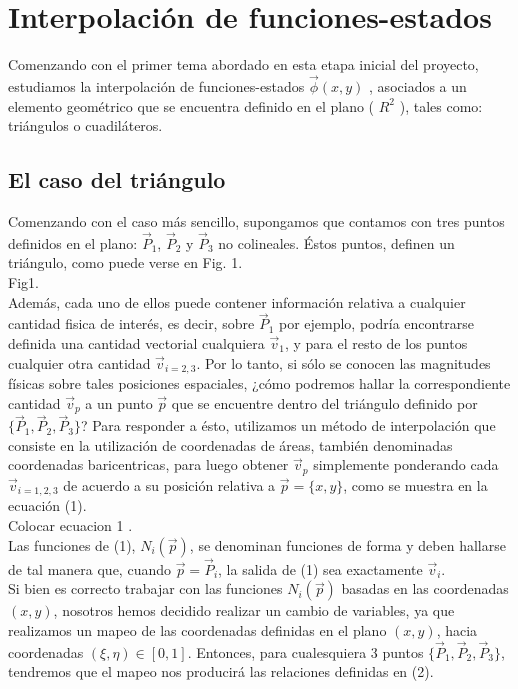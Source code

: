 \section{Interpolación de funciones-estados}

Comenzando con el primer tema abordado en esta etapa inicial del proyecto, estudiamos la interpolación de funciones-estados $\vec{ \phi } (x,y)$ , asociados a un elemento geométrico que se encuentra definido en el plano ( $R^2$ ), tales como: triángulos o cuadiláteros.

\subsection{El caso del triángulo}
\label{sec:triangulos}
Comenzando con el caso más sencillo, supongamos que contamos con tres puntos definidos en el plano: $ \vec{P}_{1} $, $ \vec{P}_{2} $ y $ \vec{P}_{3} $ no colineales. Éstos puntos, definen un triángulo, como puede verse en Fig. 1.
\\
Fig1.
\\
Además, cada uno de ellos puede contener información relativa a cualquier cantidad fisica de interés, es decir, sobre $ \vec{P}_{1} $ por ejemplo, podría encontrarse definida una cantidad vectorial cualquiera $ \vec{v}_{1}$, y para el resto de los puntos cualquier otra cantidad $ \vec{v}_{i=2,3} $. Por lo tanto, si sólo se conocen las magnitudes físicas sobre tales posiciones espaciales, ¿cómo podremos hallar la correspondiente cantidad $ \vec{v}_{p} $ a un punto $\vec{p}$ que se encuentre dentro del triángulo definido por $ \lbrace \vec{P}_{1}, \vec{P}_{2}, \vec{P}_{3}  \rbrace $? Para responder a ésto, utilizamos un método de interpolación que consiste en la utilización de coordenadas de áreas, también denominadas coordenadas baricentricas, para luego obtener $ \vec{v}_{p} $ simplemente ponderando cada $ \vec{v}_{i=1,2,3} $ de acuerdo a su posición relativa a $ \vec{p} = \lbrace x,y \rbrace $, como se muestra en la ecuación (1).
\\
Colocar ecuacion 1 .
\\
Las funciones de (1), $ N_{i} ( \vec{p} )$, se denominan funciones de forma y deben hallarse de tal manera que, cuando $ \vec{p} = \vec{P}_{i} $, la salida de (1) sea exactamente $\vec{v}_{i}$.\\
Si bien es correcto trabajar con las funciones $ N_{i} ( \vec{p} )$ basadas en las coordenadas $(x,y)$, nosotros hemos decidido realizar un cambio de variables, ya que realizamos un mapeo de las coordenadas definidas en el plano $(x,y)$, hacia coordenadas $ (\xi, \eta) \in [0, 1] $. Entonces, para cualesquiera 3 puntos $ \lbrace \vec{P}_{1}, \vec{P}_{2}, \vec{P}_{3}  \rbrace $, tendremos que el mapeo nos producirá las relaciones definidas en (2).
